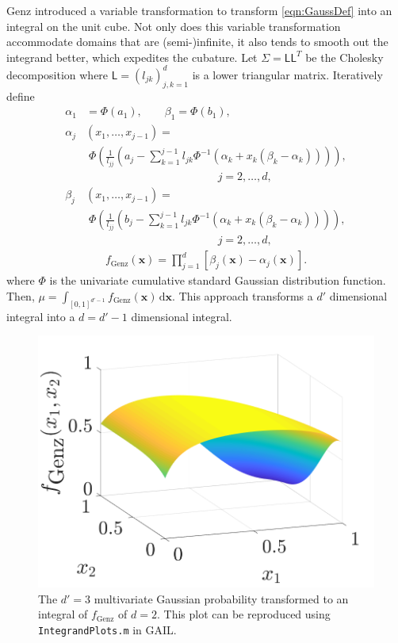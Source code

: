 \documentclass{svjour3}                     %
\newcommand{\bm}[1]{\boldsymbol{#1}}
\newcommand{\mSigma}{\mathsf{\Sigma}}
\newcommand{\dif}[1]{\text{d}{#1}}
\newcommand{\vx}{\bm{x}}
\newcommand{\dvx}{\dif{\bm{x}}}
\newcommand{\mL}{\mathsf{L}}
\newcommand{\code}[1]{\texttt{#1}}
\begin{document}
Genz \cite{Gen93} introduced a variable transformation to transform \eqref{eqn:GaussDef} into an integral on the unit cube.  Not only does this variable transformation accommodate domains that are (semi-)infinite, it also tends to smooth out the integrand better, which expedites the cubature.  Let $\mSigma= \mL \mL^T$ be the Cholesky decomposition where $\mL = (l_{jk})_{j,k=1}^d$ is a lower triangular matrix.  Iteratively define
\allowdisplaybreaks
\begin{align*}
\alpha_1& = \Phi(a_1), \qquad \beta_1 = \Phi(b_1),
\\
\alpha_j&(x_1,\dots,x_{j-1}) = 
\\
&\; \Phi
\left(
\frac{1}{l_{jj}} 
\left(
a_j - \sum_{k=1}^{j-1} l_{jk} \Phi^{-1}(\alpha_k + x_k(\beta_k-\alpha_k))
\right)
\right), 
\\
&\hspace{5cm} j=2,\dots,d,
\\
\beta_j&(x_1,\dots,x_{j-1}) = 
\\
&\; \Phi
\left(
\frac{1}{l_{jj}} 
\left(
b_j - \sum_{k=1}^{j-1} l_{jk} \Phi^{-1}(\alpha_k + x_k(\beta_k-\alpha_k))
\right)
\right), 
\\
&\hspace{5cm} j=2,\dots,d,
\end{align*}
\begin{align}
\label{fGenzdef}
f_{\text{Genz}}(\vx) = \prod_{j=1}^d [\beta_j(\vx) - \alpha_j(\vx)].
\end{align}
where $\Phi$ is the univariate cumulative standard Gaussian distribution function.  Then, $\mu = \int_{[0,1]^{d'-1}} f_{\text{Genz}}(\vx) \, \dvx$. This approach transforms a $d'$ dimensional integral into a $d=d'-1$ dimensional integral.

\begin{figure}
	\captionsetup[subfigure]{labelformat=empty}
	\centering
		\includegraphics[width=0.7\linewidth]{GenzFunc_varTx_none}
	\caption{The $d'=3$ multivariate Gaussian probability transformed to an integral of $f_{\text{Genz}}$ of $d=2$. This plot can be reproduced using \code{IntegrandPlots.m} in GAIL.}
	\label{fig:MVN_Genz}
\end{figure}
\end{document}
